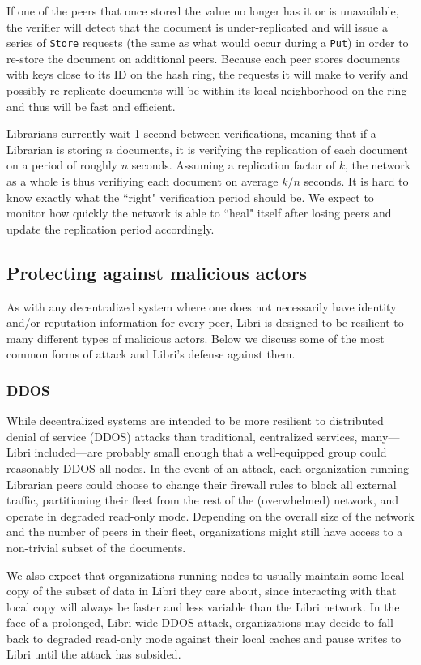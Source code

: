 \documentclass[10pt]{article}
\newcommand{\ttt}[1]{\texttt{#1}}
\begin{document}
If one of the peers that once stored the value no longer has it or is unavailable, the verifier will detect that the document is under-replicated and will issue a series of \ttt{Store} requests (the same as what would occur during a \texttt{Put}) in order to re-store the document on additional peers. Because each peer stores documents with keys close to its ID on the hash ring, the requests it will make to verify and possibly re-replicate documents will be within its local neighborhood on the ring and thus will be fast and efficient.

Librarians currently wait 1 second between verifications, meaning that if a Librarian is storing $n$ documents, it is verifying the replication of each document on a period of roughly $n$ seconds. Assuming a replication factor of $k$, the network as a whole is thus verifiying each document on average $k/n$ seconds. It is hard to know exactly what the ``right" verification period should be. We expect to monitor how quickly the network is able to ``heal" itself after losing peers and update the replication period accordingly.

\subsection{Protecting against malicious actors}
As with any decentralized system where one does not necessarily have identity and/or reputation information for every peer, Libri is designed to be resilient to many different types of malicious actors. Below we discuss some of the most common forms of attack and Libri's defense against them. 

\subsubsection{DDOS}
While decentralized systems are intended to be more resilient to distributed denial of service (DDOS) attacks than traditional, centralized services, many---Libri included---are probably small enough that a well-equipped group could reasonably DDOS all nodes. In the event of an attack, each organization running Librarian peers could choose to change their firewall rules to block all external traffic, partitioning their fleet from the rest of the (overwhelmed) network, and operate in degraded read-only mode. Depending on the overall size of the network and the number of peers in their fleet, organizations might still have access to a non-trivial subset of the documents.

We also expect that organizations running nodes to usually maintain some local copy of the subset of data in Libri they care about, since interacting with that local copy will always be faster and less variable than the Libri network. In the face of a prolonged, Libri-wide DDOS attack, organizations may decide to fall back to degraded read-only mode against their local caches and pause writes to Libri until the attack has subsided.
\end{document}
